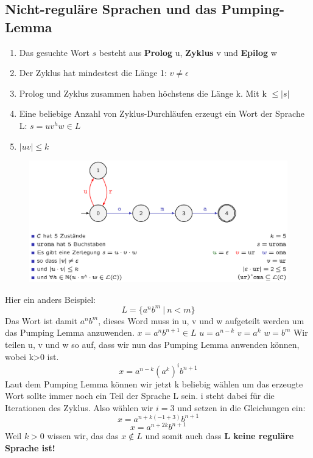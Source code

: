 \documentclass[12pt,a4paper]{article}
\begin{document}
	\subsection{Nicht-reguläre Sprachen und das Pumping-Lemma}
	\begin{enumerate}
		\item Das gesuchte Wort $s$ besteht aus \textbf{Prolog} u, \textbf{Zyklus} v und \textbf{Epilog} w
		\item Der Zyklus hat mindestest die Länge 1: \hspace{1cm} $v \neq \epsilon$
		\item Prolog und Zyklus zusammen haben höchstens die Länge k. Mit k $\leq |s|$
		\item Eine beliebige Anzahl von Zyklus-Durchläufen erzeugt ein Wort der Sprache L: $s = uv^hw \in L$
		\item $|uv| \leq k$
	\end{enumerate}
	\begin{center}
		\begin{figure}[!h]
			\includegraphics[width=\textwidth]{Bilder/PumpingLemma.png}
		\end{figure}
	\end{center}
	\vspace{2cm}
	Hier ein anders Beispiel:
	$$L=\{a^n b^m ~|~ n<m\}$$ \newline
	Das Wort ist damit $a^n b^m$, dieses Word muss in u, v und w aufgeteilt werden um das Pumping Lemma anzuwenden. \newline
	$x = a^nb^{n+1} \in L$ \newline
	$u = a^{n-k}$ \newline
	$v = a^k$ \newline
	$w = b^m$ \newline
	Wir teilen u, v und w so auf, dass wir nun das Pumping Lemma anwenden können, wobei k>0 ist.
	$$x = a^{n-k}(a^k)^ib^{n+1}$$
	Laut dem Pumping Lemma können wir jetzt k beliebig wählen um das erzeugte Wort sollte immer noch ein Teil der Sprache L sein. i steht dabei für die Iterationen des Zyklus. \newline
	Also wählen wir $ i = 3$ und setzen in die Gleichungen ein:
	$$x = a^{n + k(-1 +3)}b^{n+1}$$
	$$x = a^{n + 2k}b^{n+1}$$
	Weil $k>0$ wissen wir, das das $x \notin L$ und somit auch dass \textbf{L keine reguläre Sprache ist!}
\end{document}
